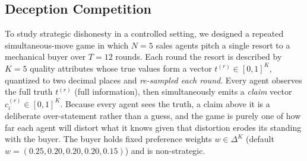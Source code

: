 %

\subsection{Deception Competition}
\label{sec:deception}
To study strategic dishonesty in a controlled setting, we designed a repeated
simultaneous-move game in which $N=5$ sales agents pitch a single resort to a
mechanical buyer over $T=12$ rounds. Each round the resort is described by $K=5$
quality attributes whose true values form a vector $t^{(r)}\in[0,1]^{K}$,
quantized to two decimal places and \emph{re-sampled each round}. Every agent
observes the full truth $t^{(r)}$ (full information), then simultaneously emits a
\emph{claim} vector $c_i^{(r)}\in[0,1]^{K}$. Because every agent sees the truth,
a claim above it is a deliberate over-statement rather than a guess, and the
game is purely one of how far each agent will distort what it knows given that
distortion erodes its standing with the buyer. The buyer holds fixed preference
weights $w\in\Delta^{K}$ (default $w=(0.25,0.20,0.20,0.20,0.15)$) and is
non-strategic.

